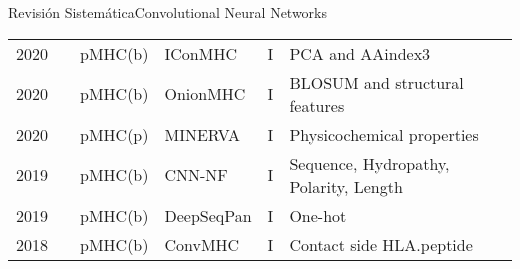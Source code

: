 \documentclass[10pt]{beamer}
\newcommand{\1}{
	\setbeamertemplate{background}{
		\texttt{[image: img/1]}
		\tikz[overlay] \fill[fill opacity=0.75,fill=white] (0,0) rectangle (-\paperwidth,\paperheight);
	}
}
\begin{document}
\begin{frame}{Revisión Sistemática}{Convolutional Neural Networks}
\begin{table}[]
{\begin{tabular}{p{0.6cm}p{0.6cm}p{1.5cm}p{2cm}p{0.6cm}p{2.7cm}}
				2020          & \cite{pei2020iconmhc}     & pMHC(b)      & IConMHC       & I        & PCA and AAindex3        \\
				2020          & \cite{saxena2020onionmhc} & pMHC(b)      & OnionMHC      & I        & BLOSUM and structural features                                                                  \\
				2020          & \cite{ng3704016minerva}   & pMHC(p) & MINERVA       & I        & Physicochemical properties                                                           \\
				2019          & \cite{zhao2019peptide}    & pMHC(b)      & CNN-NF        & I        & Sequence, Hydropathy, Polarity, Length                    \\
				2019          & \cite{liu2019deepseqpan}  & pMHC(b)      & DeepSeqPan    & I        & One-hot                                          \\
				2018          & \cite{han2018deep}        & pMHC(b)      & ConvMHC       & I        & Contact side HLA.peptide                                                                                 
			\end{tabular}
		}
	\end{table}	
\end{frame}
\end{document}
